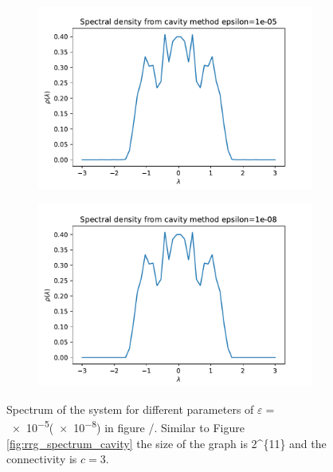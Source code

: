 \documentclass[../main.tex]{subfiles}
\begin{document}
\begin{figure}[htpb]
    \centering
    \begin{subfigure}{.5\textwidth}
        \includegraphics[width=\textwidth]{../figures/ex2_spectrum_eps_medium.pdf}
        \caption{}\label{fig:rrg_spectrum_eps_med}
    \end{subfigure}%
    \begin{subfigure}{.5\textwidth}
        \includegraphics[width=\textwidth]{../figures/ex2_spectrum_eps_small.pdf}
        \caption{}\label{fig:rrg_spectrum_eps_small}
    \end{subfigure} 
    \caption{
        Spectrum of the system for different parameters of $\varepsilon =$ \num{e-5}(\num{e-8}) in figure /.
        Similar to Figure \ref{fig:rrg_spectrum_cavity} the size of the graph is \num[parse-numbers = false]{2^{11}} and the connectivity is $c = 3$.
    }
    \label{fig:rrg_spectrum_different_eps}
\end{figure}
\end{document}
